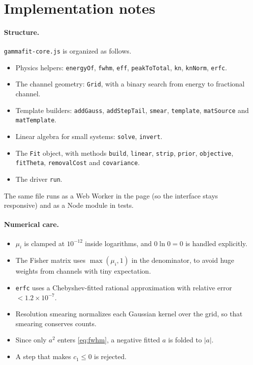 \documentclass[11pt]{article}
\newcommand{\code}[1]{\texttt{#1}}
\begin{document}
\section{Implementation notes}\label{sec:implementation}
\paragraph{Structure.} \code{gammafit-core.js} is organized as follows.
\begin{itemize}[nosep]
\item Physics helpers: \code{energyOf}, \code{fwhm}, \code{eff}, \code{peakToTotal}, \code{kn}, \code{knNorm}, \code{erfc}.
\item The channel geometry: \code{Grid}, with a binary search from energy to fractional channel.
\item Template builders: \code{addGauss}, \code{addStepTail}, \code{smear}, \code{template}, \code{matSource} and \code{matTemplate}.
\item Linear algebra for small systems: \code{solve}, \code{invert}.
\item The \code{Fit} object, with methods \code{build}, \code{linear}, \code{strip}, \code{prior}, \code{objective}, \code{fitTheta}, \code{removalCost} and \code{covariance}.
\item The driver \code{run}.
\end{itemize}
The same file runs as a Web Worker in the page (so the interface stays responsive) and as a Node module in tests.

\paragraph{Numerical care.}
\begin{itemize}[nosep]
\item $\mu_i$ is clamped at $10^{-12}$ inside logarithms, and $0\ln0 = 0$ is handled explicitly.
\item The Fisher matrix uses $\max(\mu_i,1)$ in the denominator, to avoid huge weights from channels with tiny expectation.
\item \code{erfc} uses a Chebyshev-fitted rational approximation with relative error $<1.2\times10^{-7}$.
\item Resolution smearing normalizes each Gaussian kernel over the grid, so that smearing conserves counts.
\item Since only $a^2$ enters \cref{eq:fwhm}, a negative fitted $a$ is folded to $|a|$.
\item A step that makes $c_1\le0$ is rejected.
\end{itemize}
\end{document}
